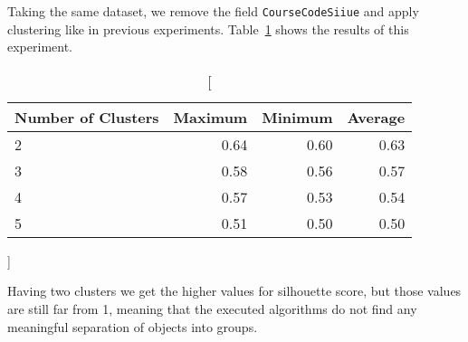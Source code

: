 Taking the same dataset, we remove the field \texttt{CourseCodeSiiue} and apply
clustering like in previous experiments. Table~\ref{tab:exp_006_res} shows the
results of this experiment.

\begin{table}[h!]
    \centering

    \begin{tabular}{| l | r | r | r |}
        \hline
        \textbf{Number of Clusters} & \textbf{Maximum} & \textbf{Minimum} & \textbf{Average} \\ \hline
        2 & 0.64 & 0.60 & 0.63 \\ \hline
        3 & 0.58 & 0.56 & 0.57 \\ \hline
        4 & 0.57 & 0.53 & 0.54 \\ \hline
        5 & 0.51 & 0.50 & 0.50 \\ \hline
    \end{tabular}

    \caption
        []
        {}

    \label{tab:exp_006_res}
\end{table}

Having two clusters we get the higher values for silhouette score, but those
values are still far from 1, meaning that the executed algorithms do not find
any meaningful separation of objects into groups.
